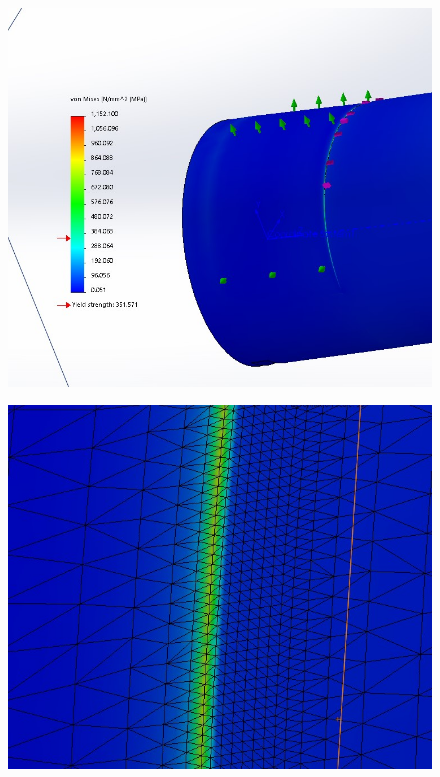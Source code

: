 \begin{figure}[H]
\centering
\begin{minipage}{.5\textwidth}
  \centering
  \includegraphics[width=.9\linewidth]{imgs/fem/AsseSim1}
  \label{fig:AsseSim1}
\end{minipage}%
\begin{minipage}{.5\textwidth}
  \centering
  \includegraphics[width=.9\linewidth]{imgs/fem/AsseSim2}
  \label{fig:AsseSim2}
\end{minipage}
\end{figure}

